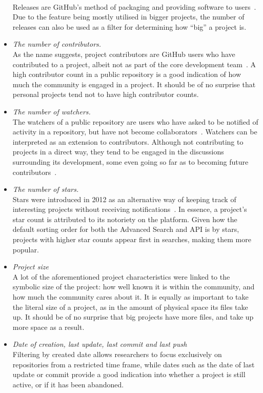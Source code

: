 \begin{itemize}
    \\Releases are GitHub's method of packaging and providing software to users~\cite{GITHUBHELP}. Due to the feature being mostly utilised in bigger projects, the number of releases can also be used as a filter for determining how ``big'' a project is.
    \item \textit{The number of contributors.}
    \\As the name suggests, project contributors are GitHub users who have contributed to a project, albeit not as part of the core development team~\cite{GITHUBHELP}. A high contributor count in a public repository is a good indication of how much the community is engaged in a project. It should be of no surprise that personal projects tend not to have high contributor counts.
    \item \textit{The number of watchers.}
    \\The watchers of a public repository are users who have asked to be notified of activity in a repository, but have not become collaborators~\cite{METRICSWATCHERS}. Watchers can be interpreted as an extension to contributors. Although not contributing to projects in a direct way, they tend to be engaged in the discussions surrounding its development, some even going so far as to becoming future contributors~\cite{WATCHERS14}.
    \item \textit{The number of stars.}
    \\Stars were introduced in 2012 as an alternative way of keeping track of interesting projects without receiving notifications~\cite{STARS}. In essence, a project's star count is attributed to its notoriety on the platform. Given how the default sorting order for both the Advanced Search and API is by stars, projects with higher star counts appear first in searches, making them more popular.
    \item \textit{Project size}
    \\A lot of the aforementioned project characteristics were linked to the symbolic size of the project: how well known it is within the community, and how much the community cares about it. It is equally as important to take the literal size of a project, as in the amount of physical space its files take up. It should be of no surprise that big projects have more files, and take up more space as a result.
    \item \textit{Date of creation, last update, last commit and last push}
    \\Filtering by created date allows researchers to focus exclusively on repositories from a restricted time frame, while dates such as the date of last update or commit provide a good indication into whether a project is still active, or if it has been abandoned.

\end{itemize}
